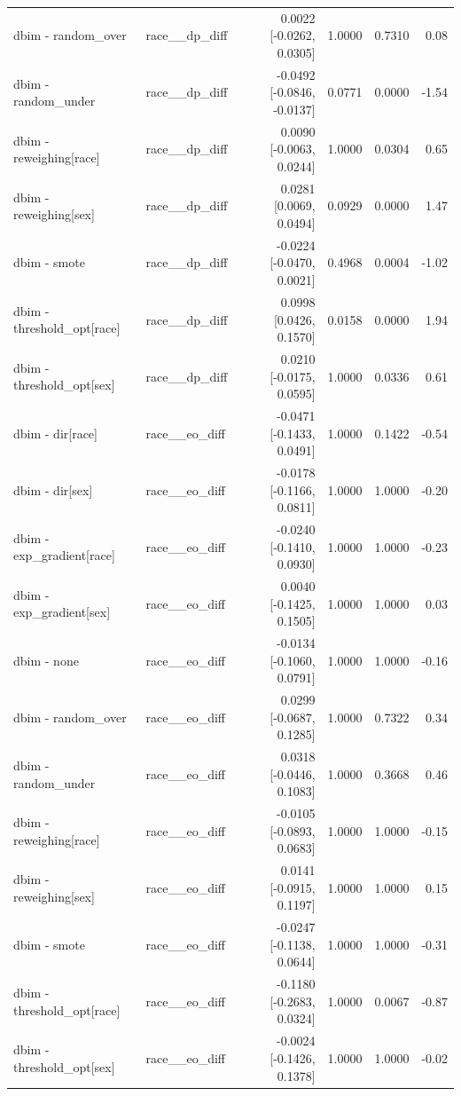 \begin{table}[t]
{\begin{tabular}{llrrrr}
dbim - random\_over & race\_\_dp\_diff & 0.0022 [-0.0262, 0.0305] & 1.0000 & 0.7310 & 0.08 \\
dbim - random\_under & race\_\_dp\_diff & -0.0492 [-0.0846, -0.0137] & 0.0771 & 0.0000 & -1.54 \\
dbim - reweighing[race] & race\_\_dp\_diff & 0.0090 [-0.0063, 0.0244] & 1.0000 & 0.0304 & 0.65 \\
dbim - reweighing[sex] & race\_\_dp\_diff & 0.0281 [0.0069, 0.0494] & 0.0929 & 0.0000 & 1.47 \\
dbim - smote & race\_\_dp\_diff & -0.0224 [-0.0470, 0.0021] & 0.4968 & 0.0004 & -1.02 \\
dbim - threshold\_opt[race] & race\_\_dp\_diff & 0.0998 [0.0426, 0.1570] & 0.0158 & 0.0000 & 1.94 \\
dbim - threshold\_opt[sex] & race\_\_dp\_diff & 0.0210 [-0.0175, 0.0595] & 1.0000 & 0.0336 & 0.61 \\
dbim - dir[race] & race\_\_eo\_diff & -0.0471 [-0.1433, 0.0491] & 1.0000 & 0.1422 & -0.54 \\
dbim - dir[sex] & race\_\_eo\_diff & -0.0178 [-0.1166, 0.0811] & 1.0000 & 1.0000 & -0.20 \\
dbim - exp\_gradient[race] & race\_\_eo\_diff & -0.0240 [-0.1410, 0.0930] & 1.0000 & 1.0000 & -0.23 \\
dbim - exp\_gradient[sex] & race\_\_eo\_diff & 0.0040 [-0.1425, 0.1505] & 1.0000 & 1.0000 & 0.03 \\
dbim - none & race\_\_eo\_diff & -0.0134 [-0.1060, 0.0791] & 1.0000 & 1.0000 & -0.16 \\
dbim - random\_over & race\_\_eo\_diff & 0.0299 [-0.0687, 0.1285] & 1.0000 & 0.7322 & 0.34 \\
dbim - random\_under & race\_\_eo\_diff & 0.0318 [-0.0446, 0.1083] & 1.0000 & 0.3668 & 0.46 \\
dbim - reweighing[race] & race\_\_eo\_diff & -0.0105 [-0.0893, 0.0683] & 1.0000 & 1.0000 & -0.15 \\
dbim - reweighing[sex] & race\_\_eo\_diff & 0.0141 [-0.0915, 0.1197] & 1.0000 & 1.0000 & 0.15 \\
dbim - smote & race\_\_eo\_diff & -0.0247 [-0.1138, 0.0644] & 1.0000 & 1.0000 & -0.31 \\
dbim - threshold\_opt[race] & race\_\_eo\_diff & -0.1180 [-0.2683, 0.0324] & 1.0000 & 0.0067 & -0.87 \\
dbim - threshold\_opt[sex] & race\_\_eo\_diff & -0.0024 [-0.1426, 0.1378] & 1.0000 & 1.0000 & -0.02 \\
\bottomrule
\end{tabular}}
\end{table}
